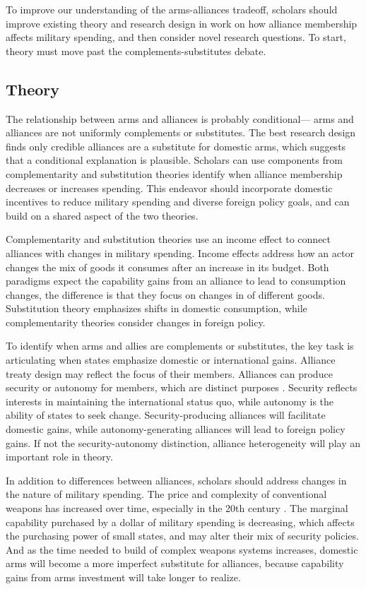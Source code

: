 \documentclass[12pt]{article}
\begin{document}
To improve our understanding of the arms-alliances tradeoff, scholars should improve existing theory and research design in work on how alliance membership affects military spending, and then consider novel research questions. To start, theory must move past the complements-substitutes debate.  


\subsection*{Theory} 

The relationship between arms and alliances is probably conditional--- arms and alliances are not uniformly complements or substitutes. The best research design finds only credible alliances are a substitute for domestic arms, which suggests that a conditional explanation is plausible. Scholars can use components from complementarity and substitution theories identify when alliance membership decreases or increases spending. This endeavor should incorporate domestic incentives to reduce military spending and diverse foreign policy goals, and can build on a shared aspect of the two theories. 

Complementarity and substitution theories use an income effect to connect alliances with changes in military spending. Income effects address how an actor changes the mix of goods it consumes after an increase in its budget. Both paradigms expect the capability gains from an alliance to lead to consumption changes, the difference is that they focus on changes in of different goods. Substitution theory emphasizes shifts in domestic consumption, while complementarity theories consider changes in foreign policy. 

To identify when arms and allies are complements or substitutes, the key task is articulating when states emphasize domestic or international gains. Alliance treaty design may reflect the focus of their members. Alliances can produce security or autonomy for members, which are distinct purposes \citep{Morrow1991}. Security reflects interests in maintaining the international status quo, while autonomy is the ability of states to seek change. Security-producing alliances will facilitate domestic gains, while autonomy-generating alliances will lead to foreign policy gains. If not the security-autonomy distinction, alliance heterogeneity will play an important role in theory. 

In addition to differences between alliances, scholars should address changes in the nature of military spending. The price and complexity of conventional weapons has increased over time, especially in the 20th century \citep{Bitzinger2003}. The marginal capability purchased by a dollar of military spending is decreasing, which affects the purchasing power of small states, and may alter their mix of security policies. And as the time needed to build of complex weapons systems increases, domestic arms will become a more imperfect substitute for alliances, because capability gains from arms investment will take longer to realize. 
\end{document}
